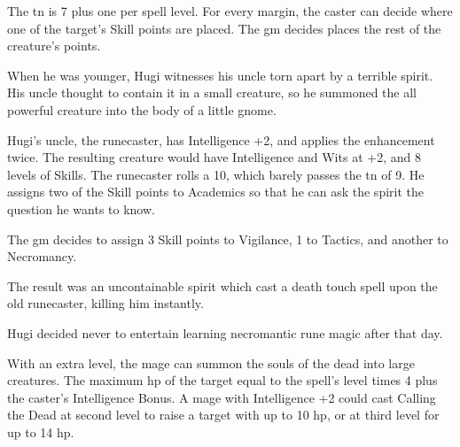\begin{multicols}{2}
The \gls{tn} is 7 plus one per spell level.  For every margin, the caster can decide where one of the target's Skill points are placed.  The \gls{gm} decides places the rest of the creature's points.

\begin{exampletext}

	When he was younger, Hugi witnesses his uncle torn apart by a terrible spirit.  His uncle thought to contain it in a small creature, so he summoned the all powerful creature into the body of a little gnome.

	Hugi's uncle, the runecaster, has Intelligence +2, and applies the enhancement twice.  The resulting creature would have Intelligence and Wits at +2, and 8 levels of Skills.  The runecaster rolls a 10, which barely passes the \gls{tn} of 9.  He assigns two of the Skill points to Academics so that he can ask the spirit the question he wants to know.

	The \gls{gm} decides to assign 3 Skill points to Vigilance, 1 to Tactics, and another to Necromancy.

	The result was an uncontainable spirit which cast a death touch spell upon the old runecaster, killing him instantly.

	Hugi decided never to entertain learning necromantic rune magic after that day.

\end{exampletext}


With an extra level, the mage can summon the souls of the dead into large creatures.  The maximum \gls{hp} of the target equal to the spell's level times 4 plus the caster's Intelligence Bonus.
A mage with Intelligence +2 could cast Calling the Dead at second level to raise a target with up to 10 \gls{hp}, or at third level for up to 14 \gls{hp}.

\end{multicols}


